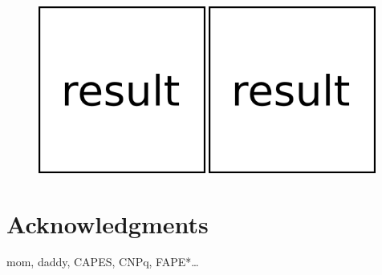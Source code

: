 \documentclass[a1]{sciposter}
\begin{document}
\begin{multicols}{3}
\begin{figure}
	\includegraphics[width=0.49\textwidth]{fig/result.png}
	\includegraphics[width=0.49\textwidth]{fig/result.png}
\end{figure}


\section{Acknowledgments}
mom, daddy, CAPES, CNPq, FAPE*\ldots


\end{multicols}
\end{document}

